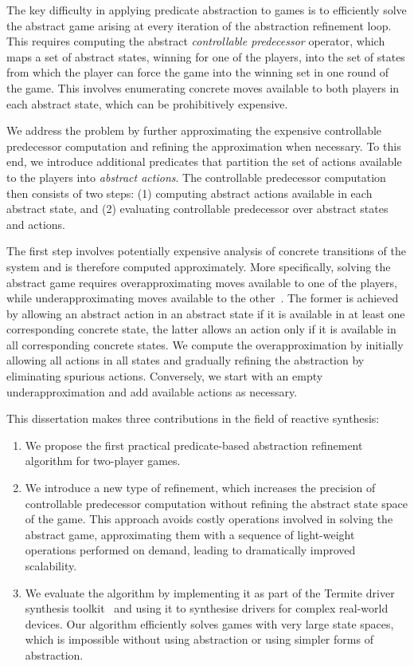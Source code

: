 The key difficulty in applying predicate abstraction to games is to efficiently solve the abstract game arising at every iteration of the abstraction refinement loop.  This requires computing the abstract \emph{controllable predecessor} operator, which maps a set of abstract states, winning for one of the players, into the set of states from which the player can force the game into the winning set in one round of the game.  This involves enumerating concrete moves available to both players in each abstract state, which can be prohibitively expensive.  

We address the problem by further approximating the expensive controllable predecessor computation and refining the approximation when necessary. To this end, we introduce additional predicates that partition the set of actions available to the players into \emph{abstract actions}.  The controllable predecessor computation then consists of two steps: (1) computing abstract actions available in each abstract state, and (2) evaluating controllable predecessor over abstract states and actions.  

The first step involves potentially expensive analysis of concrete transitions of the system and is therefore computed approximately.  More specifically, solving the abstract game requires overapproximating moves available to one of the players, while underapproximating moves available to the other~\cite{Henzinger_JM_03}.  The former is achieved by allowing an abstract action in an abstract state if it is available in at least one corresponding concrete state, the latter allows an action only if it is available in all corresponding concrete states.  We compute the overapproximation by initially allowing all actions in all states and gradually refining the abstraction by eliminating spurious actions.  Conversely, we start with an empty underapproximation and add available actions as necessary.

This dissertation makes three contributions in the field of reactive synthesis:
\begin{enumerate}
    \item We propose the first practical predicate-based abstraction refinement algorithm for two-player games.

    \item We introduce a new type of refinement, which increases the precision of controllable predecessor computation without refining the abstract state space of the game.  This approach avoids costly operations involved in solving the abstract game, approximating them with a sequence of light-weight operations performed on demand, leading to dramatically improved scalability.

    \item We evaluate the algorithm by implementing it as part of the Termite driver synthesis toolkit~\cite{Ryzhyk_WKLRSV_14} and using it to synthesise drivers for complex real-world devices.  Our algorithm efficiently solves games with very large state spaces, which is impossible without using abstraction or using simpler forms of abstraction.
\end{enumerate}

